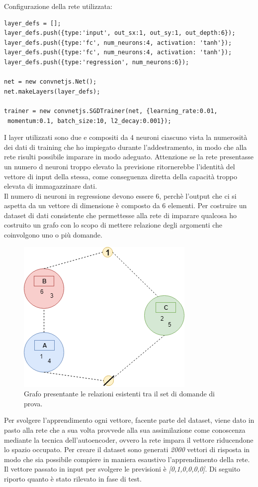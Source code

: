 \documentclass[10pt,a4paper]{article}
\begin{document}
Configurazione della rete utilizzata:\\
\begin{verbatim}layer_defs = [];
layer_defs.push({type:'input', out_sx:1, out_sy:1, out_depth:6});
layer_defs.push({type:'fc', num_neurons:4, activation: 'tanh'});
layer_defs.push({type:'fc', num_neurons:4, activation: 'tanh'});
layer_defs.push({type:'regression', num_neurons:6});

net = new convnetjs.Net();
net.makeLayers(layer_defs);

trainer = new convnetjs.SGDTrainer(net, {learning_rate:0.01,
 momentum:0.1, batch_size:10, l2_decay:0.001});
\end{verbatim}
\noindent
I layer utilizzati sono due e compositi da 4 neuroni ciascuno vista la numerosit\`a dei dati di training che ho impiegato durante l'addestramento, in modo che alla rete risulti possibile imparare in modo adeguato. Attenzione se la rete presentasse un numero d neuroni troppo elevato la previsione ritornerebbe l'identit\`a del vettore di input della stessa, come conseguenza diretta della capacit\`a troppo elevata di immagazzinare dati.\\
Il numero di neuroni in regressione devono essere 6, perch\`e l'output che ci si aspetta da un vettore di dimensione \`e composto da 6 elementi.
\noindent
Per costruire un dataset di dati consistente che permettesse alla rete di imparare qualcosa ho costruito un grafo con lo scopo di mettere relazione degli argomenti che coinvolgono uno o pi\`u domande.
\begin{figure}[H]
\centering
	\includegraphics[width=0.60\linewidth]{image/grafo_trainset.png}
	\caption{Grafo presentante le relazioni esistenti tra il set di domande di prova.}
\end{figure}
\noindent
Per svolgere l'apprendimento ogni vettore, facente parte del dataset, viene dato in pasto alla rete che a sua volta provvede alla sua assimilazione come conoscenza mediante la tecnica dell'autoencoder,
ovvero la rete impara il vettore riducendone lo spazio occupato.
Per creare il dataset sono generati \textit{2000} vettori di risposta in modo che sia possibile compiere in maniera esaustivo l'apprendimento della rete.
\\
Il vettore passato in input per svolgere le previsioni \`e \textit{[0,1,0,0,0,0]}. 
Di seguito riporto quanto \`e stato rilevato in  fase di test.
\noindent
\end{document}
